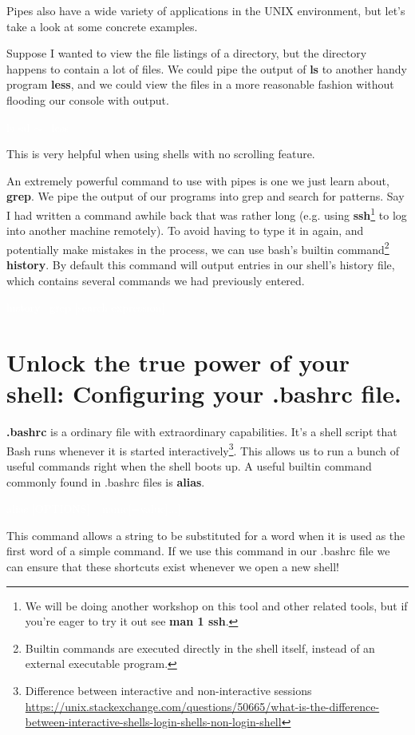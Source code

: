 \documentclass[oneside]{book}
\newcommand{\commandline}[1]{\begin{center} \colorbox{Dark}{\textcolor{white}{#1}} \end{center}}
\begin{document}
Pipes also have a wide variety of applications in the UNIX environment, but let's take a look at some concrete examples.

Suppose I wanted to view the file listings of a directory, but the directory happens to contain a lot of files. We could pipe the output of \textbf{ls} to another handy program \textbf{less}, and we could view the files in a more reasonable fashion without flooding our console with output.
\commandline{ls -al $\sim$ \textbar \ less}
\vspace{0.15}
This is very helpful when using shells with no scrolling feature.

An extremely powerful command to use with pipes is one we just learn about, \textbf{grep}. We pipe the output of our programs into grep and search for patterns. Say I had written a command awhile back that was rather long (e.g. using \textbf{ssh}\footnote{We will be doing another workshop on this tool and other related tools, but if you're eager to try it out see \textbf{man 1 ssh}.} to log into another machine remotely). To avoid having to type it in again, and potentially make mistakes in the process, we can use bash's builtin command\footnote{Builtin commands are executed directly in the shell itself, instead of an external executable program.} \textbf{history}. By default this command will output entries in our shell's history file, which contains several commands we had previously entered.
\commandline{history \textbar \ grep [search expression]}
\vspace{0.15}

\section{Unlock the true power of your shell: Configuring your .bashrc file.}
\textbf{.bashrc} is a ordinary file with extraordinary capabilities. It's a shell script that Bash runs whenever it is started interactively\footnote{Difference between interactive and non-interactive sessions \url{https://unix.stackexchange.com/questions/50665/what-is-the-difference-between-interactive-shells-login-shells-non-login-shell}}. This allows us to run a bunch of useful commands right when the shell boots up. A useful builtin command commonly found in .bashrc files is \textbf{alias}. 
\commandline{alias [OPTIONS] \ [name[=value]...]}

This command allows a string to be substituted for a word when it is used as the first word of a simple command. If we use this command in our .bashrc file we can ensure that these shortcuts exist whenever we open a new shell! 
\end{document}
